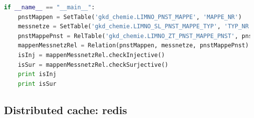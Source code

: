 \begin{lstlisting}[language=python]
if __name__ == "__main__":
    pnstMappen = SetTable('gkd_chemie.LIMNO_PNST_MAPPE', 'MAPPE_NR')
    messnetze = SetTable('gkd_chemie.LIMNO_SL_PNST_MAPPE_TYP', 'TYP_NR')
    pnstMappePnst = RelTable('gkd_chemie.LIMNO_ZT_PNST_MAPPE_PNST', pnstMappen, 'MAPPE_NR', messnetze, 'MN_NR')
    mappenMessnetzRel = Relation(pnstMappen, messnetze, pnstMappePnst)
    isInj = mappenMessnetzRel.checkInjective()
    isSur = mappenMessnetzRel.checkSurjective()
    print isInj
    print isSur

\end{lstlisting}



\subsection{Distributed cache: redis}